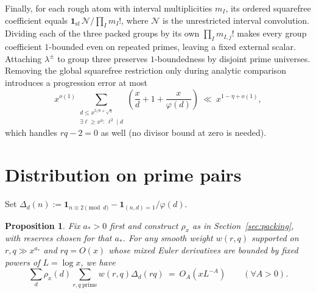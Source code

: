 \documentclass[11pt,reqno]{amsart}
\newtheorem{proposition}[theorem]{Proposition}
\theoremstyle{remark}
\newcommand{\ind}{\mathbf{1}}
\numberwithin{equation}{section}
\begin{document}
Finally, for each rough atom with interval multiplicities $m_I$, its ordered squarefree coefficient equals $\ind_{\mathrm{sf}}\,\mathcal{N}/\prod_I m_I!$, where $\mathcal{N}$ is the unrestricted interval convolution. Dividing each of the three packed groups by its own $\prod_I m_{I,j}!$ makes every group coefficient $1$-bounded even on repeated primes, leaving a fixed external scalar. Attaching $\lambda^\pm$ to group three preserves $1$-boundedness by disjoint prime universes. Removing the global squarefree restriction only during analytic comparison introduces a progression error at most
\begin{equation}\label{eq:sf_error}
x^{o(1)} \sum_{\substack{d \le x^{5/8+\sqrt{\eta}}\\ \exists \ell \ge x^\eta:\, \ell^2 \mid d}} \left(\frac{x}{d} + 1 + \frac{x}{\varphi(d)}\right)
\ \ll\ x^{1 - \eta + o(1)},
\end{equation}
which handles $rq - 2 = 0$ as well (no divisor bound at zero is needed).

\section{Distribution on prime pairs}\label{sec:distribution}

Set $\Delta_d(n) := \ind_{n \equiv 2 \pmod d} - \ind_{(n,d)=1}/\varphi(d)$.

\begin{proposition}\label{prop:distribution}
Fix $a_*>0$ first and construct $\rho_x$ as in Section~\ref{sec:packing}, with reserves chosen for that $a_*$. For any smooth weight $w(r,q)$ supported on $r,q \gg x^{a_*}$ and $rq = O(x)$ whose mixed Euler derivatives are bounded by fixed powers of $L = \log x$, we have
\begin{equation}\label{eq:distrib}
\sum_d \rho_x(d) \sum_{r,q\ \mathrm{prime}} w(r,q)\Delta_d(rq)
\ =\ O_A(x L^{-A}) \qquad (\forall A > 0).
\end{equation}
\end{proposition}
\end{document}
